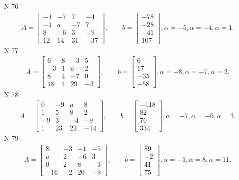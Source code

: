 \documentclass[11pt]{report}
\begin{document}
N 76
\begin{align*}
 A = \left[\begin{matrix}-4 & -7 & 7 & -4\\-1 & a & -7 & 7\\8 & -6 & 3 & -9\\12 & 14 & 31 & -37\end{matrix}\right],
    \qquad b = \left[\begin{matrix}-78\\-28\\-41\\107\end{matrix}\right], \alpha = -5, \alpha = -4, \alpha = 1. 
 \end{align*}
N 77
\begin{align*}
 A = \left[\begin{matrix}6 & 8 & -3 & 5\\-3 & 1 & a & 2\\8 & 4 & -7 & 0\\18 & 4 & 29 & -3\end{matrix}\right],
    \qquad b = \left[\begin{matrix}6\\17\\-35\\-58\end{matrix}\right], \alpha = -8, \alpha = -7, \alpha = 2. 
 \end{align*}
N 78
\begin{align*}
 A = \left[\begin{matrix}0 & -9 & a & 8\\1 & 5 & 8 & 2\\-9 & 3 & -4 & -9\\1 & 23 & 22 & -14\end{matrix}\right],
    \qquad b = \left[\begin{matrix}-118\\82\\76\\334\end{matrix}\right], \alpha = -7, \alpha = -6, \alpha = 3. 
 \end{align*}
N 79
\begin{align*}
 A = \left[\begin{matrix}8 & -3 & -1 & -5\\a & 2 & -6 & 3\\0 & 2 & 8 & -3\\-16 & -2 & 20 & -9\end{matrix}\right],
    \qquad b = \left[\begin{matrix}89\\-2\\41\\75\end{matrix}\right], \alpha = -1, \alpha = 8, \alpha = 11. 
 \end{align*}
\end{document}
